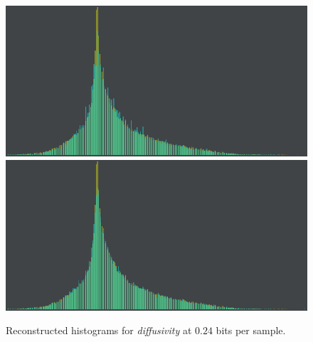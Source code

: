 \begin{figure}
	{\includegraphics[width=0.24\linewidth]{img/histogram/different-metrics/kolmogorov_smirnov.png}}
	{\includegraphics[width=0.24\linewidth]{img/histogram/different-metrics/kullback_liebler.png}}
	\caption{Reconstructed histograms for \emph{diffusivity} at $0.24$ bits per sample.}
	\label{fig:histogram-metrics-comparison2}
\end{figure}

